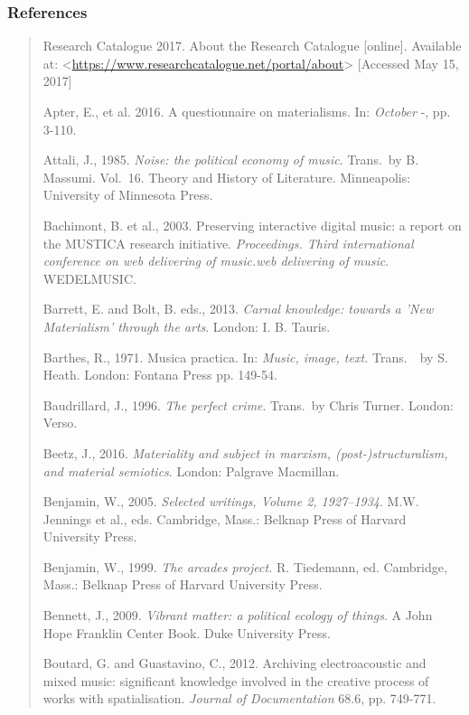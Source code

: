 \hypertarget{references}{%
\subsubsection{References}\label{references}}

\begin{quote}
Research Catalogue 2017. About the Research Catalogue {[}online{]}.
Available at:
\textless{}\href{https://www.researchcatalogue.net/portal/about}{{https://www.researchcatalogue.net/portal/about}}\textgreater{}
{[}Accessed May 15, 2017{]}

Apter, E., et al. 2016. A questionnaire on materialisms. In:
\emph{October} -, pp. 3-110.

Attali, J., 1985. \emph{Noise: the political economy of music}.
Trans.~by B. Massumi. Vol.~16. Theory and History of Literature.
Minneapolis: University of Minnesota Press.

Bachimont, B. et al., 2003. Preserving interactive digital music: a
report on the MUSTICA research initiative. \emph{Proceedings. Third
international conference on web delivering of music.web delivering of
music}. WEDELMUSIC.

Barrett, E. and Bolt, B. eds., 2013. \emph{Carnal knowledge: towards a
'New Materialism' through the arts}. London: I. B. Tauris.

Barthes, R., 1971. Musica practica. In: \emph{Music, image, text.}
Trans.~~by S. Heath. London: Fontana Press pp. 149-54.

Baudrillard, J., 1996. \emph{The perfect crime}. Trans.~by Chris Turner.
London: Verso.

Beetz, J., 2016. \emph{Materiality and subject in marxism,
(post-)structuralism, and material semiotics}. London: Palgrave
Macmillan.

Benjamin, W., 2005. \emph{Selected writings, Volume 2, 1927--1934}. M.W.
Jennings et al., eds. Cambridge, Mass.: Belknap Press of Harvard
University Press.

Benjamin, W., 1999. \emph{The arcades project.} R. Tiedemann, ed.
Cambridge, Mass.: Belknap Press of Harvard University Press.

Bennett, J., 2009. \emph{Vibrant matter: a political ecology of things}.
A John Hope Franklin Center Book. Duke University Press.

Boutard, G. and Guastavino, C., 2012. Archiving electroacoustic and
mixed music: significant knowledge involved in the creative process of
works with spatialisation. \emph{Journal of Documentation} 68.6, pp.
749-771.


\end{quote}
